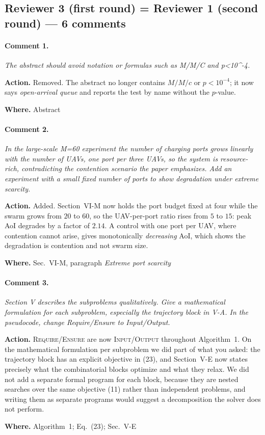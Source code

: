 \documentclass[10pt]{article}
\newcommand{\rev}[1]{\par\medskip\noindent\textit{#1}\par\smallskip}
\newcommand{\act}[2]{\noindent\textbf{Action.} #1\par\noindent\textbf{Where.} #2\par}
\begin{document}
\subsection*{Reviewer 3 (first round) = Reviewer 1 (second round) --- 6 comments}

\paragraph{Comment 1.}
\rev{The abstract should avoid notation or formulas such as M/M/C and p<10\textasciicircum{}-4.}
\act{Removed. The abstract no longer contains $M/M/c$ or $p<10^{-4}$; it now says \emph{open-arrival queue} and reports the test by name without the $p$-value.}{Abstract}

\paragraph{Comment 2.}
\rev{In the large-scale M=60 experiment the number of charging ports grows linearly with the number of UAVs, one port per three UAVs, so the system is resource-rich, contradicting the contention scenario the paper emphasizes. Add an experiment with a small fixed number of ports to show degradation under extreme scarcity.}
\act{Added. Section~VI-M now holds the port budget fixed at four while the swarm grows from $20$ to $60$, so the UAV-per-port ratio rises from $5$ to $15$: peak AoI degrades by a factor of $2.14$. A control with one port per UAV, where contention cannot arise, gives monotonically \emph{decreasing} AoI, which shows the degradation is contention and not swarm size.}{Sec.~VI-M, paragraph \emph{Extreme port scarcity}}

\paragraph{Comment 3.}
\rev{Section V describes the subproblems qualitatively. Give a mathematical formulation for each subproblem, especially the trajectory block in V-A. In the pseudocode, change Require/Ensure to Input/Output.}
\act{\textsc{Require}/\textsc{Ensure} are now \textsc{Input}/\textsc{Output} throughout Algorithm~1. On the mathematical formulation per subproblem we did part of what you asked: the trajectory block has an explicit objective in (23), and Section~V-E now states precisely what the combinatorial blocks optimize and what they relax. We did not add a separate formal program for each block, because they are nested searches over the same objective (11) rather than independent problems, and writing them as separate programs would suggest a decomposition the solver does not perform.}{Algorithm~1; Eq.~(23); Sec.~V-E}
\end{document}
